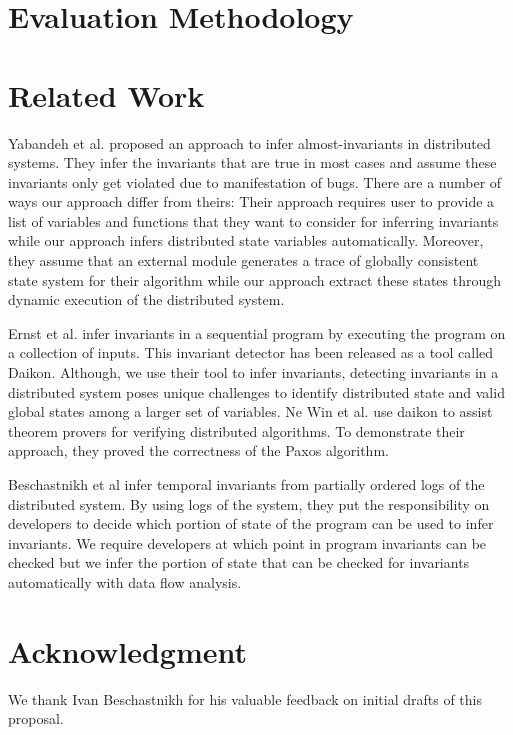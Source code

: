 \section{Evaluation Methodology}



\section{Related Work}

Yabandeh et al.\cite{yabandeh2011finding} proposed an approach to
infer almost-invariants in distributed systems. They infer the
invariants that are true in most cases and assume these invariants
only get violated due to manifestation of bugs. There are a number of
ways our approach differ from theirs: Their approach requires user to
provide a list of variables and functions that they want to consider
for inferring invariants while our approach infers distributed state
variables automatically. Moreover, they assume that an external module
generates a trace of globally consistent state system for their
algorithm while our approach extract these states through dynamic
execution of the distributed system.

Ernst et al.\cite{ernst2001dynamically} infer invariants in a
sequential program by executing the program on a collection of inputs.
This invariant detector has been released as a tool called
Daikon\cite{ernst2007daikon}. Although, we use their tool to infer
invariants, detecting invariants in a distributed system poses unique
challenges to identify distributed state and valid global states among
a larger set of variables. Ne Win et al.\cite{NeWinEGKL04} use daikon
to assist theorem provers for verifying distributed algorithms. To
demonstrate their approach, they proved the correctness of the Paxos
algorithm.

Beschastnikh et al \cite{temporalInv} infer temporal invariants from partially ordered logs of the distributed system. By using logs of the system, they put the responsibility on developers to decide which portion of state of the program can be used to infer invariants. We require developers at which point in program invariants can be checked but we infer the portion of state that can be checked for invariants automatically with data flow analysis.


\section{Acknowledgment}
We thank Ivan Beschastnikh for his valuable feedback on initial drafts of this proposal.